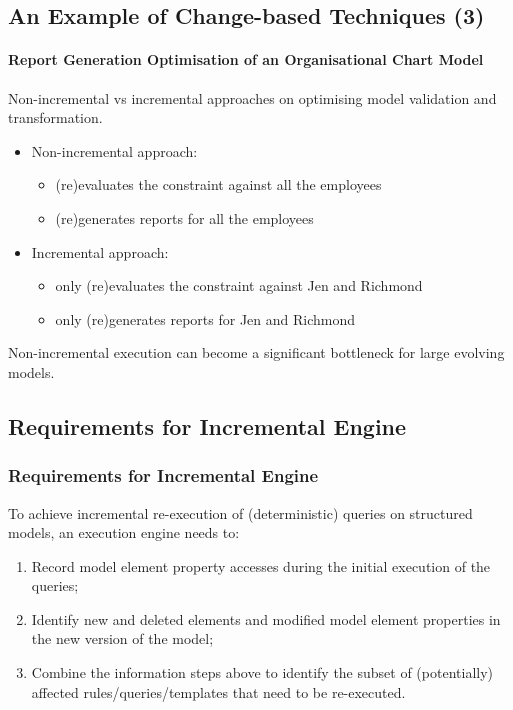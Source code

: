\documentclass{beamer}
\begin{document}
\begin{frame}
\section{An Example of Change-based Techniques (3)}
\framesubtitle{Report Generation Optimisation of an Organisational Chart Model}
Non-incremental vs incremental approaches on optimising model validation and transformation.
\begin{itemize}
\item Non-incremental approach:
    \begin{itemize}
    \item (re)evaluates the constraint against all the employees
    \item (re)generates reports for all the employees
    \end{itemize}
\item Incremental approach:
    \begin{itemize}
    \item  only (re)evaluates the constraint against Jen and Richmond
    \item only (re)generates reports for Jen and Richmond
    \end{itemize}
\end{itemize}
Non-incremental execution can become a significant bottleneck for large evolving models.
\end{frame}

\begin{frame}
\section{Requirements for Incremental Engine}
\frametitle{Requirements for Incremental Engine}
To achieve incremental re-execution of (deterministic) queries on structured models, an execution engine needs to:
\begin{enumerate}
\item Record model element property accesses during the initial execution of the queries;
\item Identify new and deleted elements and modified model element properties in the new version of the model;
\item Combine the information steps above to identify the subset of (potentially) affected rules/queries/templates that need to be re-executed.
\end{enumerate}
\end{frame}
\end{document}
